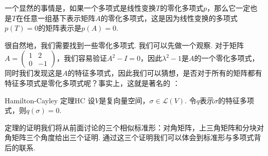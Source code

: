 一个显然的事情是，如果一个多项式是线性变换$T$的零化多项式$p$，那么它一定也是$T$在任意一组基下表示矩阵$A$的零化多项式，这是因为线性变换的多项式$p(T)=0$的矩阵表示是$p(A)=0$.

很自然地，我们需要找到一些零化多项式. 我们可以先做一个观察. 对于矩阵$A=\begin{pmatrix}
        1 & 2 \\ 0 & -1
    \end{pmatrix}$，我们容易验证$A^2-I=0$，因此$\lambda^2-1$是$A$的一个零化多项式，同时我们发现这是$A$的特征多项式，因此我们可以猜想，是否对于所有的矩阵都有特征多项式是零化多项式呢？事实上，这就是著名的 ：
\begin{theorem}{Hamilton-Cayley 定理}{HC} 
    设$V$是复向量空间，$\sigma\in \mathcal{L}(V)$. 令$q$表示$\sigma$的特征多项式，则$q(\sigma)=0$.
\end{theorem}
定理的证明我们将从前面讨论的三个相似标准形：对角矩阵，上三角矩阵和分块对角矩阵三个角度给出三个证明. 通过这三个证明我们可以体会到标准形与多项式背后的联系.


